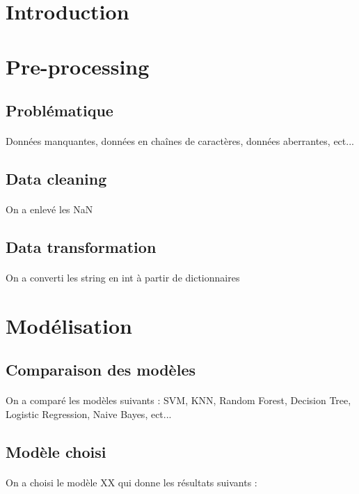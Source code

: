 \documentclass[11pt,a4paper]{article}
\begin{document}


\pagestyle{fancy}


\newpage

\section{Introduction}

\section{Pre-processing}

\subsection{Problématique}

\paragraph{} Données manquantes, données en chaînes de caractères, données aberrantes, ect...

\subsection{Data cleaning}

\paragraph{} On a enlevé les NaN

\subsection{Data transformation}

\paragraph{} On a converti les string en int à partir de dictionnaires

\section{Modélisation}

\subsection{Comparaison des modèles}

\paragraph{} On a comparé les modèles suivants : SVM, KNN, Random Forest, Decision Tree, Logistic Regression, Naive Bayes, ect...

\subsection{Modèle choisi}

\paragraph{} On a choisi le modèle XX qui donne les résultats suivants :
\end{document}
